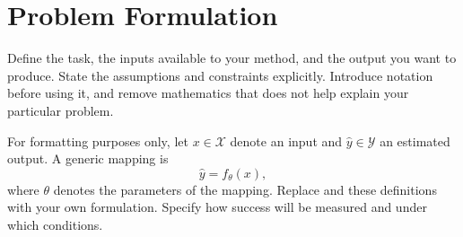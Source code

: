 \section{Problem Formulation}
\label{sec:problem}
Define the task, the inputs available to your method, and the output you
want to produce. State the assumptions and constraints explicitly.
Introduce notation before using it, and remove mathematics that does not
help explain your particular problem.

For formatting purposes only, let $x\in\mathcal{X}$ denote an input and
$\hat{y}\in\mathcal{Y}$ an estimated output. A generic mapping is
\begin{equation}
  \hat{y}=f_{\theta}(x),
  \label{eq:mapping}
\end{equation}
where $\theta$ denotes the parameters of the mapping. Replace
 and these definitions with your own formulation.
Specify how success will be measured and under which conditions.
